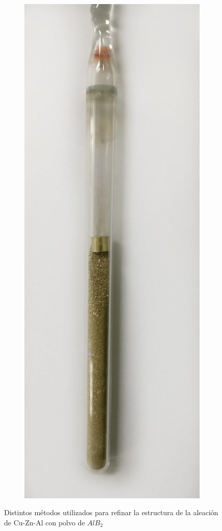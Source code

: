 \documentclass[a4paper,12pt,fleqn,twoside,openany]{book}
\begin{document}
\begin{figure}[h]
\begin{subfigure}{0.1\textwidth}
        \includegraphics[width=\textwidth]{Img/Procedimiento/ClavoPolvo.jpg}
        \caption{}
        \label{fig:ClavoPolvo}
    \end{subfigure}
 \caption{Distintos métodos utilizados para refinar la estructura de la aleación de Cu-Zn-Al con polvo de $AlB_2$} 
    \end{figure}
    
\end{document}
